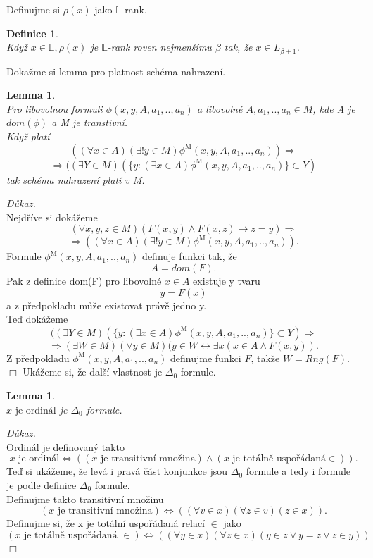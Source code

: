 \documentclass[12pt,a4paper]{article}
\newtheorem{lemma}[veta]{Lemma}
\newtheorem{definice}[veta]{Definice}
\newenvironment{proof}
{\noindent \textit{D\r{u}kaz.}}
{\hspace*{\fill} $\Box$}
\begin{document}
Definujme si $ \rho(x) $ jako $ \mathbb{L} $-rank.
\begin{definice}~\\
\label{def:rank}
Kdy\v{z} $ x  \in  \mathbb{L}, \rho(x) $ je $ \mathbb{L} $-rank roven nejmen\v{s}\'{i}mu $  \beta $ tak, \v{z}e
$  x \in L_{\beta +1}  $. 
\end{definice}
Doka\v{z}me si lemma pro platnost sch\'{e}ma nahrazen\'{i}.
\begin{lemma}
~\\
Pro libovolnou formuli $ \phi(x,y,A,a_1,..,a_n)$ a libovoln\'{e} $  A,a_1,..,a_n \in M$, kde A je $ dom(\phi) $ a M je transtivn\'{i}.\\
Kdy\v{z} plat\'{i} 
\[ ((\forall x\in A) (\exists!y\in M) \phi^\mathrm{M}(x,y,A,a_1,..,a_n)) \Rightarrow \]\[ \Rightarrow((\exists Y \in M)(\{y:(\exists x \in A)  \phi^\mathrm{M}(x,y,A,a_1,..,a_n) \} \subset Y) \]
tak sch\'{e}ma nahrazen\'{i} plat\'{i} v M.
\label{lem:nahr}
\end{lemma}
\begin{proof}
~\\
Nejd\v{r}\'{i}ve si dok\'{a}\v{z}eme 
\[(\forall x,y,z \in M)(F(x,y) \wedge F(x,z) \rightarrow z=y)\Rightarrow \]\[ \Rightarrow ((\forall x\in A) (\exists!y\in M) \phi^\mathrm{M}(x,y,A,a_1,..,a_n)) .\]
Formule $ \phi^\mathrm{M}(x,y,A,a_1,..,a_n)$ definuje funkci tak, \v{z}e \[ A=dom(F) .\] 
Pak z definice dom(F) pro libovoln\'{e} $ x \in A $ existuje y tvaru \[ y=F(x) \] a z p\v{r}edpokladu m\r{u}\v{z}e existovat pr\'{a}v\v{e} jedno y.  \\
Te\v{d} dok\'{a}\v{z}eme 
\[ ((\exists Y \in M)(\{y:(\exists x \in A)  \phi^\mathrm{M}(x,y,A,a_1,..,a_n) \} \subset Y) \Rightarrow \]\[\Rightarrow (\exists W \in M) (\forall y \in M) ( y \in W \leftrightarrow \exists x ( x \in A \wedge F(x,y)).\]
Z p\v{r}edpokladu $ \phi^\mathrm{M}(x,y,A,a_1,..,a_n) $ definujme funkci $ F $, tak\v{z}e $ W=Rng(F) $.
\end{proof}
\newpage
Uk\'{a}\v{z}eme si, \v{z}e dal\v{s}\'{i} vlastnost je $\Delta_0$-formule.
\begin{lemma}
~\\
$ x \text{ je ordin\'{a}l} $ je $\Delta_0$ formule.
\end{lemma}
\begin{proof}~\\
Ordin\'{a}l je definovan\'{y} takto 
\[  x \text{ je ordin\'{a}l}  \Leftrightarrow  ((x \text{ je transitivn\'{i} mno\v{z}ina})   \wedge  (x \text{ je tot\'{a}ln\v{e} uspo\v{r}\'{a}dan\'{a}}\in )). \]
Te\v{d} si uk\'{a}\v{z}eme, \v{z}e lev\'{a} i prav\'{a} \v{c}\'{a}st konjunkce jsou $\Delta_0$ formule a tedy i formule je podle definice $\Delta_0$ formule.\\
Definujme takto transitivn\'{i} mno\v{z}inu
\[ (x \text{ je transitivn\'{i} mno\v{z}ina}) \Leftrightarrow  ((\forall v \in x) (\forall z \in v) (z \in x)) .\]
Definujme si, \v{z}e x je tot\'{a}ln\'{i} uspo\v{r}\'{a}dan\'{a} relac\'{i} $\in$ jako
\[ (x \text{ je tot\'{a}ln\v{e} uspo\v{r}\'{a}dan\'{a} }\in) \Leftrightarrow  ((\forall y \in x)(\forall z \in x)(y \in z \vee y=z \vee z\in y )) \] 
\end{proof}~\\
\end{document}

